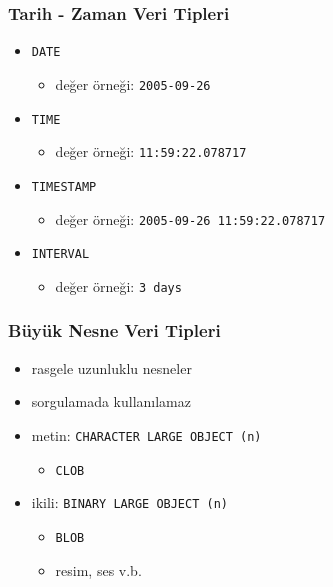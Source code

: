 \documentclass[dvipsnames]{beamer}
\theoremstyle{definition}
\theoremstyle{example}
\theoremstyle{plain}
\begin{document}
\begin{frame}
  \frametitle{Tarih - Zaman Veri Tipleri}

  \begin{itemize}
    \item \texttt{DATE}
    \begin{itemize}
      \item değer örneği: \texttt{2005-09-26}
    \end{itemize}

    \pause
    \medskip
    \item \texttt{TIME}
    \begin{itemize}
      \item değer örneği: \texttt{11:59:22.078717}
    \end{itemize}

    \pause
    \medskip
    \item \texttt{TIMESTAMP}
    \begin{itemize}
      \item değer örneği: \texttt{2005-09-26 11:59:22.078717}
    \end{itemize}

    \pause
    \medskip
    \item \texttt{INTERVAL}
    \begin{itemize}
      \item değer örneği: \texttt{3 days}
    \end{itemize}
  \end{itemize}
\end{frame}

\begin{frame}
  \frametitle{Büyük Nesne Veri Tipleri}

  \begin{itemize}
    \item rasgele uzunluklu nesneler
    \item sorgulamada kullanılamaz

    \pause
    \bigskip
    \item metin: \texttt{CHARACTER LARGE OBJECT (n)}
    \begin{itemize}
      \item \texttt{CLOB}
    \end{itemize}

    \pause
    \item ikili: \texttt{BINARY LARGE OBJECT (n)}
    \begin{itemize}
      \item \texttt{BLOB}
      \item resim, ses v.b.
    \end{itemize}
  \end{itemize}
\end{frame}
\end{document}
